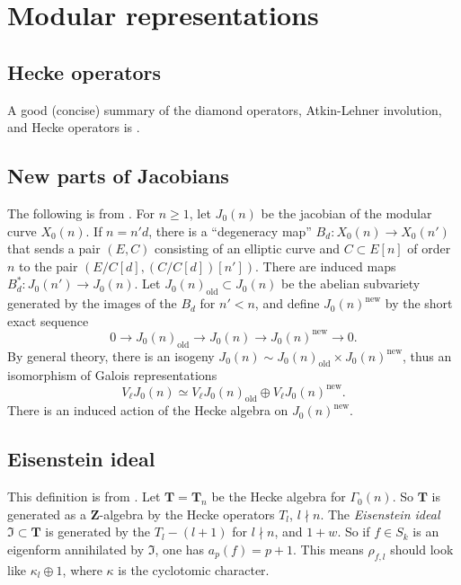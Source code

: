 \documentclass{amsart}
\newcommand{\dT}{\mathbf{T}}
\newcommand{\dZ}{\mathbf{Z}}
\newcommand{\fI}{\mathfrak{I}}
\begin{document}
\section{Modular representations}


\subsection{Hecke operators}

A good (concise) summary of the diamond operators, Atkin-Lehner involution, and 
Hecke operators is \cite[ch.2 \S 5]{mw84}. 


\subsection{New parts of Jacobians}

The following is from \cite[\S 2]{mazur-1978}. 
For $n\geqslant 1$, let $J_0(n)$ be the jacobian of the modular curve $X_0(n)$. 
If $n=n' d$, there is a ``degeneracy map'' $B_d:X_0(n)\to X_0(n')$ that sends a 
pair $(E,C)$ consisting of an elliptic curve and $C\subset E[n]$ of order $n$ 
to the pair $(E/C[d],(C/C[d])[n'])$. There are induced maps 
$B_d^\ast:J_0(n')\to J_0(n)$. Let $J_0(n)_\mathrm{old}\subset J_0(n)$ be the 
abelian subvariety generated by the images of the $B_d$ for $n'<n$, and define 
$J_0(n)^\mathrm{new}$ by the short exact sequence 
\[
  0 \to J_0(n)_\mathrm{old} \to J_0(n) \to J_0(n)^\mathrm{new} \to 0 .
\]
By general theory, there is an isogeny 
$J_0(n)\sim J_0(n)_\mathrm{old}\times J_0(n)^\mathrm{new}$, thus an isomorphism 
of Galois representations 
\[
  V_\ell J_0(n) \simeq V_\ell J_0(n)_\mathrm{old}\oplus V_\ell J_0(n)^\mathrm{new} .
\]
There is an induced action of the Hecke algebra on $J_0(n)^\mathrm{new}$. 


\subsection{Eisenstein ideal}

This definition is from \cite[II.9]{mazur-1977}. Let $\dT=\dT_n$ be the Hecke 
algebra for $\Gamma_0(n)$. So $\dT$ is generated as a $\dZ$-algebra by the 
Hecke operators $T_l$, $l\nmid n$. The \emph{Eisenstein ideal} 
$\fI\subset \dT$ is generated by the $T_l-(l+1)$ for $l\nmid n$, and 
$1+w$. So if $f\in S_k$ is an eigenform annihilated by $\fI$, one has 
$a_p(f) = p+1$. This means $\rho_{f,l}$ should look like 
$\kappa_l\oplus 1$, where $\kappa$ is the cyclotomic character. 
\end{document}
